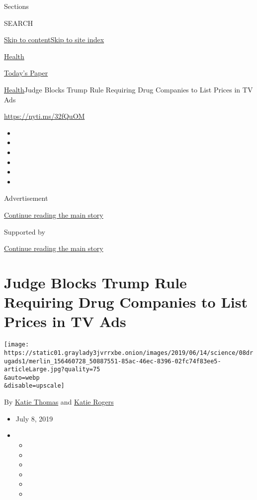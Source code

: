 Sections

SEARCH

\protect\hyperlink{site-content}{Skip to
content}\protect\hyperlink{site-index}{Skip to site index}

\href{https://www.nytimes3xbfgragh.onion/section/health}{Health}

\href{https://myaccount.nytimes3xbfgragh.onion/auth/login?response_type=cookie\&client_id=vi}{}

\href{https://www.nytimes3xbfgragh.onion/section/todayspaper}{Today's
Paper}

\href{/section/health}{Health}\textbar{}Judge Blocks Trump Rule
Requiring Drug Companies to List Prices in TV Ads

\url{https://nyti.ms/32fQuOM}

\begin{itemize}
\item
\item
\item
\item
\item
\item
\end{itemize}

Advertisement

\protect\hyperlink{after-top}{Continue reading the main story}

Supported by

\protect\hyperlink{after-sponsor}{Continue reading the main story}

\hypertarget{judge-blocks-trump-rule-requiring-drug-companies-to-list-prices-in-tv-ads}{%
\section{Judge Blocks Trump Rule Requiring Drug Companies to List Prices
in TV
Ads}\label{judge-blocks-trump-rule-requiring-drug-companies-to-list-prices-in-tv-ads}}

\texttt{[image: https://static01.graylady3jvrrxbe.onion/images/2019/06/14/science/08drugads1/merlin\_156460728\_50887551-85ac-46ec-8396-02fc74f83ee5-articleLarge.jpg?quality=75\\\&auto=webp\\\&disable=upscale]}

By \href{https://www.nytimes3xbfgragh.onion/by/katie-thomas}{Katie
Thomas} and
\href{https://www.nytimes3xbfgragh.onion/by/katie-rogers}{Katie Rogers}

\begin{itemize}
\item
  July 8, 2019
\item
  \begin{itemize}
  \item
  \item
  \item
  \item
  \item
  \item
  \end{itemize}
\end{itemize}

